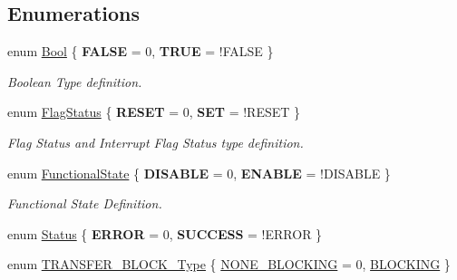 \subsection*{\-Enumerations}
\begin{DoxyCompactItemize}
\item 
enum \hyperlink{group___l_p_c___types___public___types_ga39db6982619d623273fad8a383489309}{\-Bool} \{ {\bfseries \-F\-A\-L\-S\-E} =  0, 
{\bfseries \-T\-R\-U\-E} =  !\-F\-A\-L\-S\-E
 \}
\begin{DoxyCompactList}\small\item\em \-Boolean \-Type definition. \end{DoxyCompactList}\item 
enum \hyperlink{group___l_p_c___types___public___types_ga89136caac2e14c55151f527ac02daaff}{\-Flag\-Status} \{ {\bfseries \-R\-E\-S\-E\-T} =  0, 
{\bfseries \-S\-E\-T} =  !\-R\-E\-S\-E\-T
 \}
\begin{DoxyCompactList}\small\item\em \-Flag \-Status and \-Interrupt \-Flag \-Status type definition. \end{DoxyCompactList}\item 
enum \hyperlink{group___l_p_c___types___public___types_gac9a7e9a35d2513ec15c3b537aaa4fba1}{\-Functional\-State} \{ {\bfseries \-D\-I\-S\-A\-B\-L\-E} =  0, 
{\bfseries \-E\-N\-A\-B\-L\-E} =  !\-D\-I\-S\-A\-B\-L\-E
 \}
\begin{DoxyCompactList}\small\item\em \-Functional \-State \-Definition. \end{DoxyCompactList}\item 
enum \hyperlink{group___l_p_c___types___public___types_ga67a0db04d321a74b7e7fcfd3f1a3f70b}{\-Status} \{ {\bfseries \-E\-R\-R\-O\-R} =  0, 
{\bfseries \-S\-U\-C\-C\-E\-S\-S} =  !\-E\-R\-R\-O\-R
 \}
\item 
enum \hyperlink{group___l_p_c___types___public___types_gaddb88bff95842be0c54e0e979f45cf95}{\-T\-R\-A\-N\-S\-F\-E\-R\-\_\-\-B\-L\-O\-C\-K\-\_\-\-Type} \{ \hyperlink{group___l_p_c___types___public___types_ggaddb88bff95842be0c54e0e979f45cf95ae00130e64382c35d172d226b79aa9acb}{\-N\-O\-N\-E\-\_\-\-B\-L\-O\-C\-K\-I\-N\-G} =  0, 
\hyperlink{group___l_p_c___types___public___types_ggaddb88bff95842be0c54e0e979f45cf95a854a1cd6e3a98db9e290dddea29725e7}{\-B\-L\-O\-C\-K\-I\-N\-G}
 \}
\end{DoxyCompactItemize}



